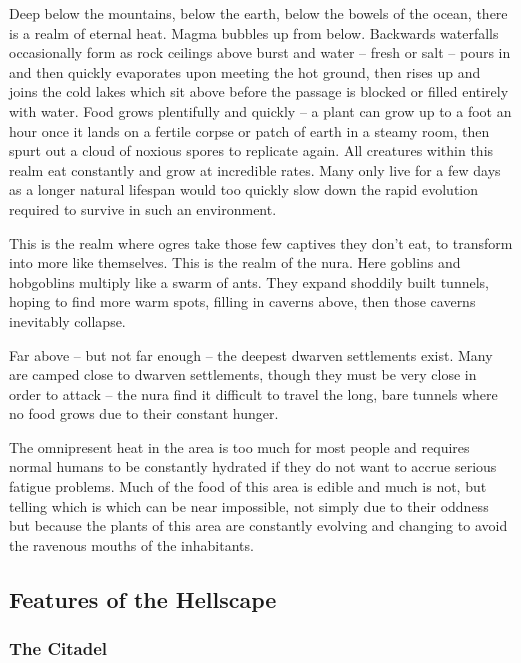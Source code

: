 \begin{multicols}{2}

\noindent
Deep below the mountains, below the earth, below the bowels of the ocean, there is a realm of eternal heat.
Magma bubbles up from below.
Backwards waterfalls occasionally form as rock ceilings above burst and water -- fresh or salt -- pours in and then quickly evaporates upon meeting the hot ground, then rises up and joins the cold lakes which sit above before the passage is blocked or filled entirely with water.
Food grows plentifully and quickly -- a plant can grow up to a foot an hour once it lands on a fertile corpse or patch of earth in a steamy room, then spurt out a cloud of noxious spores to replicate again.
All creatures within this realm eat constantly and grow at incredible rates.
Many only live for a few days as a longer natural lifespan would too quickly slow down the rapid evolution required to survive in such an environment.

  This is the realm where ogres take those few captives they don't eat, to transform into more like themselves.
  This is the realm of the nura.
  Here goblins and hobgoblins multiply like a swarm of ants.
  They expand shoddily built tunnels, hoping to find more warm spots, filling in caverns above, then those caverns inevitably collapse.

  Far above -- but not far enough -- the deepest dwarven settlements exist.
  Many are camped close to dwarven settlements, though they must be very close in order to attack -- the nura find it difficult to travel the long, bare tunnels where no food grows due to their constant hunger.

  The omnipresent heat in the area is too much for most people and requires normal humans to be constantly hydrated if they do not want to accrue serious fatigue problems.
  Much of the food of this area is edible and much is not, but telling which is which can be near impossible, not simply due to their oddness but because the plants of this area are constantly evolving and changing to avoid the ravenous mouths of the inhabitants.

\subsection{Features of the Hellscape}

\subsubsection{The Citadel}


\end{multicols}
